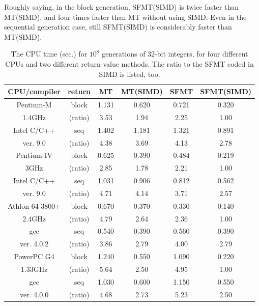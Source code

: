 \documentclass[acmnow]{acmtrans2m}
\begin{document}
Roughly saying, in the block generation, 
SFMT(SIMD) is twice faster than MT(SIMD),
and four times faster than MT without using SIMD.
Even in the sequential generation case,
still SFMT(SIMD) is considerably faster than MT(SIMD).

\begin{table}
\begin{center}
\begin{tabular}{|c|c||c|c|c|c|}
\hline
CPU/compiler & return & MT & MT(SIMD) & SFMT & SFMT(SIMD)  \\ \hline \hline
Pentium-M & block & 1.131  & 0.620  & 0.721  & 0.320 \\ \cline{3-6}
1.4GHz & (ratio) & 3.53\phantom{0}  & 1.94\phantom{0}  & 2.25\phantom{0}
  & 1.00\phantom{0} \\ \cline{2-6}
Intel C/C++ & seq & 1.402  & 1.181  & 1.321  & 0.891 \\ \cline{3-6}
ver. 9.0 & (ratio) & 4.38\phantom{0}  & 3.69\phantom{0}  & 4.13\phantom{0}
  & 2.78\phantom{0} \\ \hline
Pentium-IV & block & 0.625  & 0.390  & 0.484  & 0.219 \\ \cline{3-6}
3GHz & (ratio) & 2.85\phantom{0}  & 1.78\phantom{0}  & 2.21\phantom{0}  
& 1.00\phantom{0} \\ \cline{2-6}
Intel C/C++ & seq & 1.031  & 0.906  & 0.812  & 0.562 \\ \cline{3-6}
ver. 9.0 & (ratio) & 4.71\phantom{0}  & 4.14\phantom{0}  & 3.71\phantom{0}
  & 2.57\phantom{0} \\ \hline
Athlon 64 3800+ & block & 0.670  & 0.370  & 0.330  & 0.140 \\ \cline{3-6}
2.4GHz & (ratio) & 4.79\phantom{0}  & 2.64\phantom{0}  & 2.36\phantom{0}
  & 1.00\phantom{0} \\ \cline{2-6}
gcc & seq & 0.540  & 0.390  & 0.560  & 0.390 \\ \cline{3-6}
ver. 4.0.2 & (ratio) & 3.86\phantom{0}  & 2.79\phantom{0}  & 4.00\phantom{0}
  & 2.79\phantom{0} \\ \hline
PowerPC G4 & block & 1.240  & 0.550  & 1.090  & 0.220 \\ \cline{3-6}
1.33GHz & (ratio) & 5.64\phantom{0}  & 2.50\phantom{0}  & 4.95\phantom{0}
  & 1.00\phantom{0} \\ \cline{2-6}
gcc & seq & 1.030  & 0.600  & 1.150  & 0.550 \\ \cline{3-6}
ver. 4.0.0 & (ratio) & 4.68\phantom{0}  & 2.73\phantom{0}  & 5.23\phantom{0}
  & 2.50\phantom{0} \\ \hline
\end{tabular}
\end{center}
\caption{The CPU time (sec.) for $10^8$ generations of 32-bit integers,
for four different CPUs and two different return-value methods. 
The ratio to the SFMT coded in SIMD is listed, too.}\label{tab:speed}
\end{table}
\end{document}
